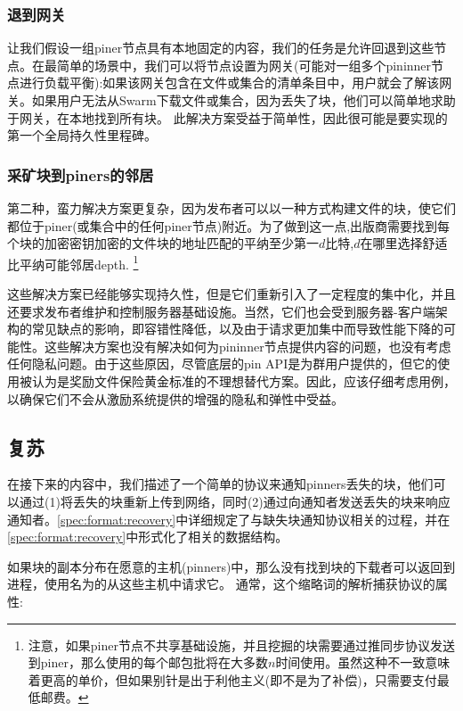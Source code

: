 \subsubsection{退到网关}

让我们假设一组piner节点具有本地固定的内容，我们的任务是允许回退到这些节点。在最简单的场景中，我们可以将节点设置为网关(可能对一组多个pininner节点进行负载平衡):如果该网关包含在文件或集合的清单条目中，用户就会了解该网关。如果用户无法从Swarm下载文件或集合，因为丢失了块，他们可以简单地求助于网关，在本地找到所有块。
此解决方案受益于简单性，因此很可能是要实现的第一个全局持久性里程碑。  

\subsubsection{采矿块到piners的邻居}

第二种，蛮力解决方案更复杂，因为发布者可以以一种方式构建文件的块，使它们都位于piner(或集合中的任何piner节点)附近。为了做到这一点,出版商需要找到每个块的加密密钥加密的文件块的地址匹配的平纳至少第一$d$比特,$d$在哪里选择舒适比平纳可能邻居depth. %
%
\footnote{注意，如果piner节点不共享基础设施，并且挖掘的块需要通过推同步协议发送到piner，那么使用的每个邮包批将在大多数$n$时间使用。虽然这种不一致意味着更高的单价，但如果别针是出于利他主义(即不是为了补偿)，只需要支付最低邮费。
}

这些解决方案已经能够实现持久性，但是它们重新引入了一定程度的集中化，并且还要求发布者维护和控制服务器基础设施。当然，它们也会受到服务器-客户端架构的常见缺点的影响，即容错性降低，以及由于请求更加集中而导致性能下降的可能性。这些解决方案也没有解决如何为pininner节点提供内容的问题，也没有考虑任何隐私问题。由于这些原因，尽管底层的pin API是为群用户提供的，但它的使用被认为是奖励文件保险黄金标准的不理想替代方案。因此，应该仔细考虑用例，以确保它们不会从激励系统提供的增强的隐私和弹性中受益。



\subsection{复苏\statusyellow}\label{sec:recovery-chunks}


在接下来的内容中，我们描述了一个简单的协议来通知pinners丢失的块，他们可以通过(1)将丢失的块重新上传到网络，同时(2)通过向通知者发送丢失的块来响应通知者。\ref{spec:format:recovery}中详细规定了与缺失块通知协议相关的过程，并在\ref{spec:format:recovery}中形式化了相关的数据结构。

如果块的副本分布在愿意的主机(pinners)中，那么没有找到块的下载者可以返回到进程，使用名为的从这些主机中请求它。
通常，这个缩略词的解析捕获协议的属性:

